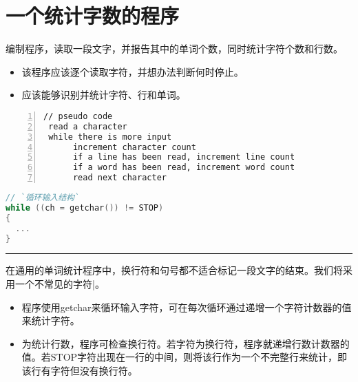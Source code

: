\section{一个统计字数的程序}



\begin{frame}[fragile]\ft{\secname}
编制程序，读取一段文字，并报告其中的单词个数，同时统计字符个数和行数。
\end{frame}


\begin{frame}[fragile]\ft{\secname}
\begin{itemize}
\item 该程序应该逐个读取字符，并想办法判断何时停止。\\[0.2in]
\item 应该能够识别并统计字符、行和单词。
\end{itemize}
\end{frame}

\begin{frame}[fragile]\ft{\secname}
\begin{lstlisting}[frame=single,numbers=left]
// pseudo code
 read a character
 while there is more input
      increment character count
      if a line has been read, increment line count
      if a word has been read, increment word count
      read next character
\end{lstlisting}
\end{frame}

\begin{frame}[fragile]\ft{\secname}
\begin{lstlisting}[language=c]
// `循环输入结构`
while ((ch = getchar()) != STOP)
{
  ...
}
\end{lstlisting}
\rule{\textwidth}{1mm}\vspace{.5mm}\pause 

在通用的单词统计程序中，换行符和句号都不适合标记一段文字的结束。我们将采用一个不常见的字符|。
\end{frame}

\begin{frame}[fragile]\ft{\secname}
\begin{itemize}
\item 程序使用getchar来循环输入字符，可在每次循环通过递增一个\textcolor{acolor1}{字符计数器}的值来统计字符。\\[0.15in]
\item 为统计行数，程序可检查换行符。若字符为换行符，程序就递增\textcolor{acolor1}{行数计数器}的值。若STOP字符出现在一行的中间，则将该行作为一个\textcolor{acolor1}{不完整行}来统计，即该行有字符但没有换行符。
\end{itemize}
\end{frame}

